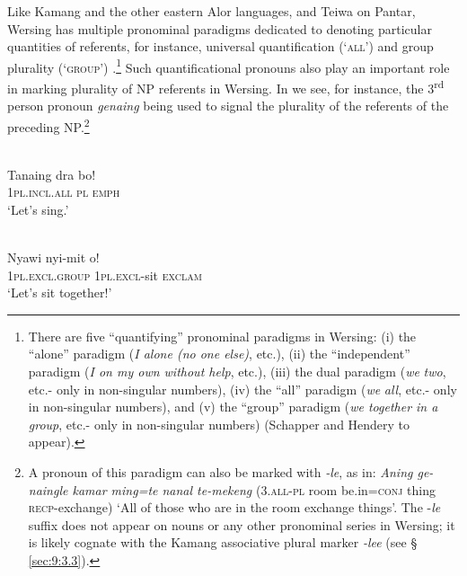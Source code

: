 Like Kamang and the other eastern Alor languages, and Teiwa on Pantar, Wersing has multiple pronominal paradigms dedicated to denoting particular quantities of referents, for instance, universal quantification (`\textsc{all')}  and group plurality (`\textsc{group}') .\footnote{  There are five ``quantifying'' pronominal paradigms in Wersing: (i) the ``alone'' paradigm (\textit{I alone (no one else)}, etc.), (ii) the ``independent'' paradigm (\textit{I on my own without help}, etc.), (iii) the dual paradigm (\textit{we} \textit{two}, etc.- only in non-singular numbers), (iv) the ``all'' paradigm (\textit{we} \textit{all}, etc.- only in non-singular numbers), and (v) the ``group'' paradigm (\textit{we together in a group}, etc.- only in non-singular numbers) (Schapper and Hendery to appear).} Such quantificational pronouns also play an important role in marking plurality of NP referents in Wersing. In  we see, for instance, the 3\textsuperscript{rd} person pronoun \textit{genaing} being
used to signal the plurality of the referents of the preceding NP.\footnote{  A pronoun of this paradigm can also be marked with \textit{-le}, as in: \textit{Aning ge-naingle kamar ming=te nanal te-mekeng} (\textsc{3.all-pl} room be.in=\textsc{conj} thing \textsc{recp}-exchange) `All of those who are in the room exchange things'. The -\textit{le} suffix does not appear on nouns or any other pronominal series in Wersing; it is likely cognate with the Kamang associative plural marker \textit{-lee} (see {\S} \ref{sec:9:3.3}).}


\ea%
\label{ex:9:58}
 \\
\gll  Tanaing dra bo! \\
   \textsc{1pl.incl.all} \textsc{pl}   \textsc{emph}  \\
\glt `Let's sing.'
\z







\ea%
\label{ex:9:59}
 \\
\gll  Nyawi nyi-mit o! \\
   \textsc{1pl.excl.}\textsc{group} \textsc{1pl.excl}-sit \textsc{exclam}  \\
\glt `Let's sit together!'
\z







